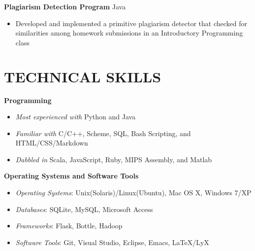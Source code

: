 \documentclass[margin]{res}
\begin{document}
\begin{resume}
\textbf{Plagiarism Detection Program} \hfill Java
\begin{itemize}[leftmargin=10pt]
\itemsep -2pt %
\item Developed and implemented a primitive plagiarism detector that checked for similarities among homework submissions in an Introductory Programming class
\end{itemize}

\section{TECHNICAL SKILLS}
\textbf{Programming}
\begin{itemize}[leftmargin=10pt]
\item \textit{Most experienced with} Python and Java
\item \textit{Familiar with} C/C++, Scheme, SQL, Bash Scripting, and HTML/CSS/Markdown
\item \textit{Dabbled in} Scala, JavaScript, Ruby, MIPS Assembly, and Matlab
\end{itemize}

\textbf{Operating Systems and Software Tools}
\begin{itemize}[leftmargin=10pt]
\item \textit{Operating Systems}: Unix(Solaris)/Linux(Ubuntu), Mac OS X, Windows 7/XP
\item \textit{Databases}: SQLite, MySQL, Microsoft Access
\item \textit{Frameworks}: Flask, Bottle, Hadoop
\item \textit{Software Tools}: Git, Visual Studio, Eclipse, Emacs, \LaTeX{}/LyX
\end{itemize}

\end{resume}
\end{document}

